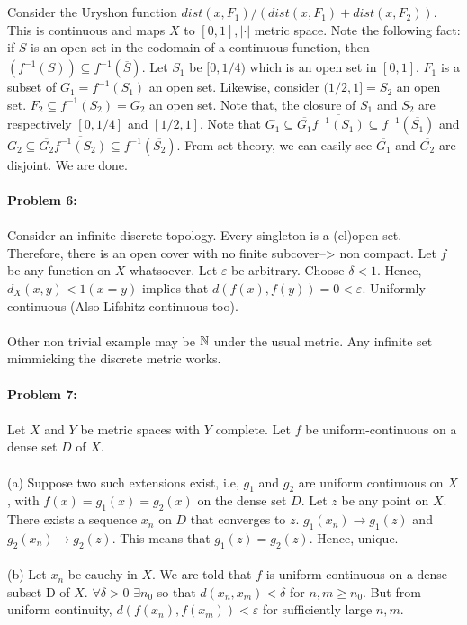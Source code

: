 \documentclass[../Main.tex]{subfiles}
\begin{document}
\\\\ Consider the Uryshon function $dist(x,F_1)/(dist(x,F_1)+dist(x,F_2))$. This is continuous and maps $X$ to $[0,1],|\cdot |$ metric space. Note the following fact: if $S$ is an open set in the codomain of a continuous function, then $\overline{(f^{-1}(S))}\subseteq f^{-1}(\overline{S})$. Let $S_1$ be $[0,1/4)$ which is an open set in $[0,1]$. $F_1$ is a subset of $G_1=f^{-1}(S_1)$ an open set. Likewise, consider $(1/2,1]=S_2$ an open set. $F_2 \subseteq f^{-1}(S_2)=G_2$ an open set. Note that, the closure of $S_1$ and $S_2$ are respectively $[0,1/4]$ and $[1/2,1]$. Note that $G_1 \subseteq \overline{G_1}\overline{f^{-1}(S_1)}\subseteq f^{-1}(\overline{S_1})$ and $G_2\subseteq \overline{G_2}\overline{f^{-1}(S_2)}\subseteq f^{-1}(\overline{S_2})$. From set theory, we can easily see $\overline{G_1}$ and $\overline{G_2}$ are disjoint. We are done.
\\\\ \textbf{Problem 6:}
\\\\ Consider an infinite discrete topology. Every singleton is a (cl)open set. Therefore, there is an open cover with no finite subcover--> non compact.
Let $f$ be any function on $X$ whatsoever. Let $\varepsilon$ be arbitrary. Choose $\delta<1$. Hence, $d_X(x,y)<1 (x=y)$ implies that $d(f(x),f(y))=0 <\varepsilon$. Uniformly continuous (Also Lifshitz continuous too).
\\\\ Other non trivial example may be $\mathbb N$ under the usual metric. Any infinite set mimmicking the discrete metric works. 
\\\\ \textbf{Problem 7:}
\\\\ Let $X$ and $Y$ be metric spaces with $Y$ complete. Let $f$ be uniform-continuous on a dense set $D$ of $X$.
\\\\ (a) Suppose two such extensions exist, i.e, $g_1$ and $g_2$ are uniform continuous on $X$, with $f(x)=g_1(x)=g_2(x)$ on the dense set $D$. Let $z$ be any point on $X$. There exists a sequence $x_n$ on $D$ that converges to $z$. $g_1(x_n)\to g_1(z)$ and $g_2(x_n)\to g_2(z)$. This means that $g_1(z)=g_2(z)$. Hence, unique.
\\\\ (b) Let $x_n$ be cauchy in $X$. We are told that $f$ is uniform continuous on a dense subset D of $X$. $\forall \delta>0$ $\exists n_0$ so that $d(x_n,x_m)<\delta$ for $n,m \geq n_0$. But from uniform continuity, $d(f(x_n),f(x_m))<\varepsilon$ for sufficiently large $n,m$. 
\end{document}
